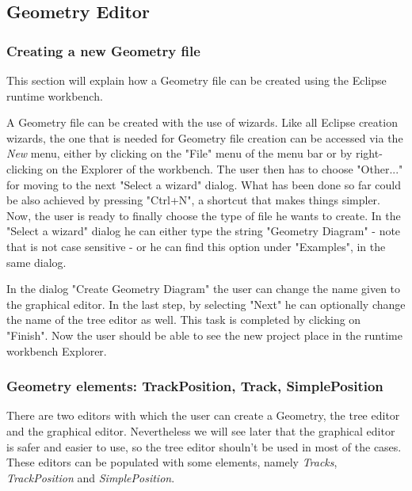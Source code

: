 \subsection{Geometry Editor}
\label{sec:userguide:geometry}

\subsubsection{Creating a new Geometry file}
\label{sec:userguide:geometry:create}
This section will explain how a Geometry file can be created using the Eclipse runtime workbench.

A Geometry file can be created with the use of wizards. Like all Eclipse creation wizards, the one
that is needed for Geometry file creation can be accessed via the \textit{New} menu, either by
clicking on the "File" menu of the menu bar or by right-clicking on the Explorer of the workbench.
The user then has to choose "Other..." for moving to the next "Select a wizard" dialog. What has
been done so far could be also achieved by pressing "Ctrl+N", a shortcut that makes things simpler.
Now, the user is ready to finally choose the type of file he wants to create. In the "Select a
wizard" dialog he can either type the string "Geometry Diagram" - note that is not case sensitive -
or he can find this option under "Examples", in the same dialog.

In the dialog "Create Geometry Diagram" the user can change the name given to the graphical editor. In the last step, by selecting "Next" he can optionally change the name of the tree editor as well. This task is completed by clicking on "Finish". Now the user should be able to see the new project place in the runtime workbench Explorer.

\subsubsection{Geometry elements: TrackPosition, Track, SimplePosition}
\label{sec:userguide:geometry:elements}
  
There are two editors with which the user can create a Geometry, the tree editor and the graphical editor. Nevertheless we will see later that the graphical editor is safer and easier to use, so the tree editor shouln't be used in most of the cases. These editors can be populated with some elements, namely \textit{Tracks}, \textit{TrackPosition} and \textit{SimplePosition}. 

